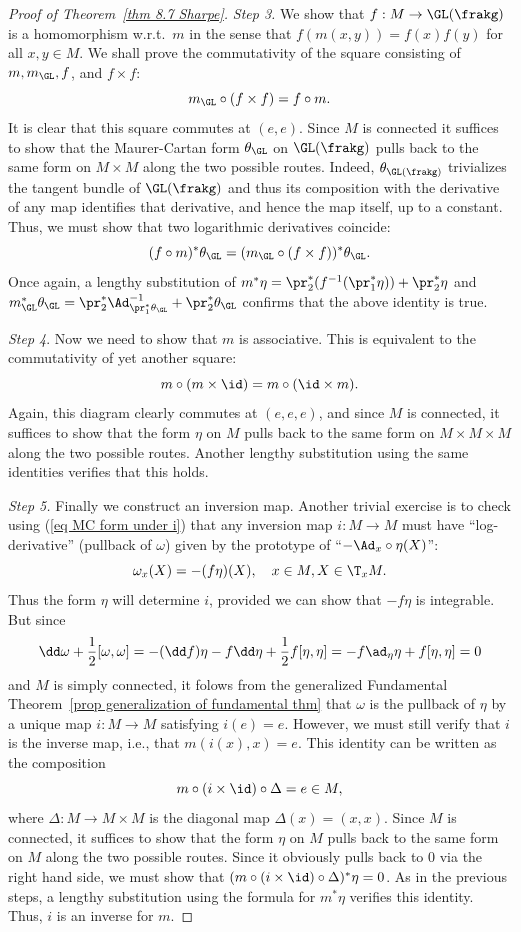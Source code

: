 \begin{proof}[Proof of Theorem~\ref{thm 8.7 Sharpe}]
    \emph{Step 3.} We show that $f:M\to \GL(\frakg)$ is a homomorphism w.r.t.\ $m$ in the sense that $f(m(x,y))=f(x)f(y)$ for all $x,y\in M$. We shall prove the commutativity of the square consisting of $m,m_{\GL},f$, and $f\times f$:
    \[m_{\GL}\circ (f\times f)=f\circ m.\]
    It is clear that this square commutes at $(e,e)$. Since $M$ is connected it suffices to show that the Maurer-Cartan form $\theta_{\GL}$ on $\GL(\frakg)$ pulls back to the same form on $M\times M$ along the two possible routes. Indeed, $\theta_{\GL(\frakg)}$ trivializes the tangent bundle of $\GL(\frakg)$ and thus its composition with the derivative of any map identifies that derivative, and hence the map itself, up to a constant. Thus, we must show that two logarithmic derivatives coincide:
    \[(f\circ m)^\ast\theta_{\GL}=(m_{\GL}\circ (f\times f))^\ast \theta_{\GL}.\]
    Once again, a lengthy substitution of $m^\ast\eta=\pr_2^\ast(f^{-1}(\pr_1^\ast\eta))+\pr_2^\ast\eta$ and $m_{\GL}^\ast\theta_{\GL}=\pr_2^\ast \Ad^{-1}_{\pr_1^\ast\theta_{\GL}}+\pr_2^\ast \theta_{\GL}$ confirms that the above identity is true.

    \emph{Step 4}. Now we need to show that $m$ is associative. This is equivalent to the commutativity of yet another square:
    \[m\circ (m\times \id)=m\circ (\id\times m).\]
    Again, this diagram clearly commutes at $(e,e,e)$, and since $M$ is connected, it suffices to show that the form $\eta$ on $M$ pulls back to the same form on $M\times M\times M$ along the two possible routes. Another lengthy substitution using the same identities verifies that this holds.

    \emph{Step 5.} Finally we construct an inversion map. Another trivial exercise is to check using (\ref{eq MC form under i}) that any inversion map $i:M\to M$ must have ``log-derivative'' (pullback of $\omega$) given by the prototype of ``$-\Ad_x\circ \eta(X)$'':
    \[\omega_x(X)=-(f\eta)(X),\quad x\in M,X\in \T_x M.\]
    Thus the form $\eta$ will determine $i$, provided we can show that $-f\eta$ is integrable. But since
    \[\dd\omega+\frac12[\omega,\omega]=-(\dd f)\eta -f\dd \eta+\frac12 f[\eta,\eta]=-f\ad_\eta\eta +f[\eta,\eta]=0\]
    and $M$ is simply connected, it folows from the generalized Fundamental Theorem~\ref{prop generalization of fundamental thm} that $\omega$ is the pullback of $\eta$ by a unique map $i:M\to M$ satisfying $i(e)=e$. However, we must still verify that $i$ is the inverse map, i.e., that $m(i(x),x)=e$. This identity can be written as the composition
    \[m\circ(i\times\id)\circ\Delta=e\in M,\]
    where $\Delta:M\to M\times M$ is the diagonal map $\Delta(x)=(x,x)$. Since $M$ is connected, it suffices to show that the form $\eta$ on $M$ pulls back to the same form on $M$ along the two possible routes. Since it obviously pulls back to $0$ via the right hand side, we must show that $(m\circ(i\times\id)\circ\Delta)^\ast\eta=0$. As in the previous steps, a lengthy substitution using the formula for $m^\ast\eta$ verifies this identity. Thus, $i$ is an inverse for $m$.


\end{proof}
